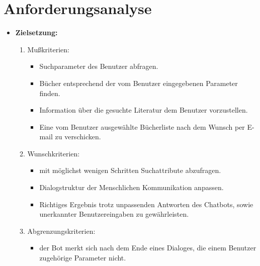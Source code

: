 \documentclass[12pt,a4paper]{scrartcl}
\begin{document}
\section{Anforderungsanalyse}
\begin{itemize}
\item \textbf{Zielsetzung:}

\begin{enumerate}

\item Mußkriterien:
	\begin{itemize}
		\item Suchparameter des Benutzer abfragen.
		\item Bücher entsprechend der vom Benutzer eingegebenen Parameter finden.
		\item Information über die gesuchte Literatur dem Benutzer vorzustellen.
		\item Eine vom Benutzer ausgewählte Bücherliste nach dem Wunsch per E-mail zu verschicken.
	\end{itemize}
	
\item Wunschkriterien:
	\begin{itemize}
		\item mit möglichst wenigen Schritten Suchattribute abzufragen.
		\item Dialogstruktur der Menschlichen Kommunikation anpassen.
		\item Richtiges Ergebnis trotz unpassenden Antworten des Chatbots, sowie unerkannter Benutzereingaben zu gewährleisten.
	\end{itemize}
	
\item Abgrenzungskriterien: 
	\begin{itemize}
		\item der Bot merkt sich nach dem Ende eines Dialoges, die einem Benutzer zugehörige Parameter nicht.
	\end{itemize}
\end{enumerate}

\end{itemize}
\end{document}
